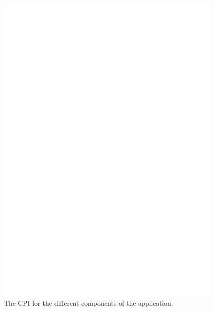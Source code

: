 \begin{figure}
  \centering
  \includegraphics[width=\textwidth]{figures/cat-cpi.pdf}
  \caption{\label{fig:cat-cpi} The CPI for the different components of the application.}
\end{figure}



